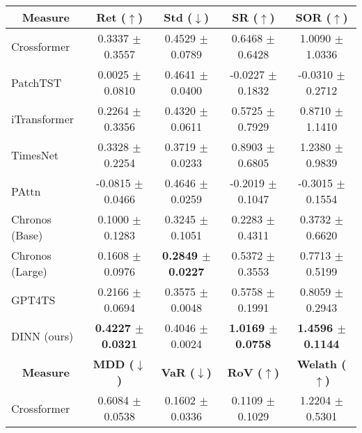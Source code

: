 \centering
{\fontsize{8pt}{11pt}\selectfont
\begin{tabular}{lcccc}
\hline
\multicolumn{1}{c}{\textbf{Measure}} & \textbf{Ret ($\uparrow$)}   & \textbf{Std ($\downarrow$)} & \textbf{SR ($\uparrow$)}   & \textbf{SOR ($\uparrow$)}    \\ \hline
Crossformer                          & 0.3337 $\pm$ 0.3557           & 0.4529 $\pm$ 0.0789           & 0.6468 $\pm$ 0.6428          & 1.0090 $\pm$ 1.0336            \\
PatchTST                             & 0.0025 $\pm$ 0.0810           & 0.4641 $\pm$ 0.0400           & -0.0227 $\pm$ 0.1832         & -0.0310 $\pm$ 0.2712           \\
iTransformer                         & 0.2264 $\pm$ 0.3356           & 0.4320 $\pm$ 0.0611           & 0.5725 $\pm$ 0.7929          & 0.8710 $\pm$ 1.1410            \\
TimesNet                             & 0.3328 $\pm$ 0.2254           & 0.3719 $\pm$ 0.0233           & 0.8903 $\pm$ 0.6805          & 1.2380 $\pm$ 0.9839            \\
PAttn                                & -0.0815 $\pm$ 0.0466          & 0.4646 $\pm$ 0.0259           & -0.2019 $\pm$ 0.1047         & -0.3015 $\pm$ 0.1554           \\
Chronos (Base)                       & 0.1000 $\pm$ 0.1283           & 0.3245 $\pm$ 0.1051           & 0.2283 $\pm$ 0.4311          & 0.3732 $\pm$ 0.6620            \\
Chronos (Large)                      & 0.1608 $\pm$ 0.0976           & \textbf{0.2849 $\pm$ 0.0227}  & 0.5372 $\pm$ 0.3553          & 0.7713 $\pm$ 0.5199            \\
GPT4TS                               & 0.2166 $\pm$ 0.0694           & 0.3575 $\pm$ 0.0048           & 0.5758 $\pm$ 0.1991          & 0.8059 $\pm$ 0.2943            \\
DINN (ours)                          & \textbf{0.4227 $\pm$ \color[HTML]{00009B} 0.0321}  & 0.4046 $\pm$ \color[HTML]{00009B} 0.0024           & \textbf{1.0169 $\pm$ \color[HTML]{00009B} 0.0758} & \textbf{1.4596 $\pm$ \color[HTML]{00009B} 0.1144}   \\ \hline
\multicolumn{1}{c}{\textbf{Measure}} & \textbf{MDD ($\downarrow$)} & \textbf{VaR ($\downarrow$)} & \textbf{RoV ($\uparrow$)}  & \textbf{Welath ($\uparrow$)} \\ \hline
Crossformer                          & 0.6084 $\pm$ 0.0538           & 0.1602 $\pm$ 0.0336           & 0.1109 $\pm$ 0.1029          & 1.2204 $\pm$ 0.5301            \\

\end{tabular}}
